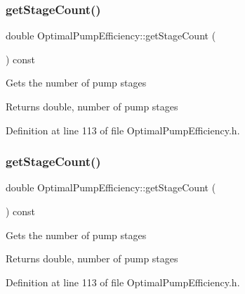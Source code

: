 \mbox{\label{class_optimal_pump_efficiency_aac0c1a4a6492bf00b245c2a61d100eaa}} 
\subsubsection{\texorpdfstring{get\+Stage\+Count()}{getStageCount()}\hspace{0.1cm}{\footnotesize\ttfamily [1/3]}}
{\footnotesize\ttfamily double Optimal\+Pump\+Efficiency\+::get\+Stage\+Count (\begin{DoxyParamCaption}{ }\end{DoxyParamCaption}) const\hspace{0.3cm}{\ttfamily [inline]}}

Gets the number of pump stages \begin{DoxyReturn}{Returns}
double, number of pump stages 
\end{DoxyReturn}


Definition at line 113 of file Optimal\+Pump\+Efficiency.\+h.

\mbox{\label{class_optimal_pump_efficiency_aac0c1a4a6492bf00b245c2a61d100eaa}} 
\subsubsection{\texorpdfstring{get\+Stage\+Count()}{getStageCount()}\hspace{0.1cm}{\footnotesize\ttfamily [2/3]}}
{\footnotesize\ttfamily double Optimal\+Pump\+Efficiency\+::get\+Stage\+Count (\begin{DoxyParamCaption}{ }\end{DoxyParamCaption}) const\hspace{0.3cm}{\ttfamily [inline]}}

Gets the number of pump stages \begin{DoxyReturn}{Returns}
double, number of pump stages 
\end{DoxyReturn}


Definition at line 113 of file Optimal\+Pump\+Efficiency.\+h.

